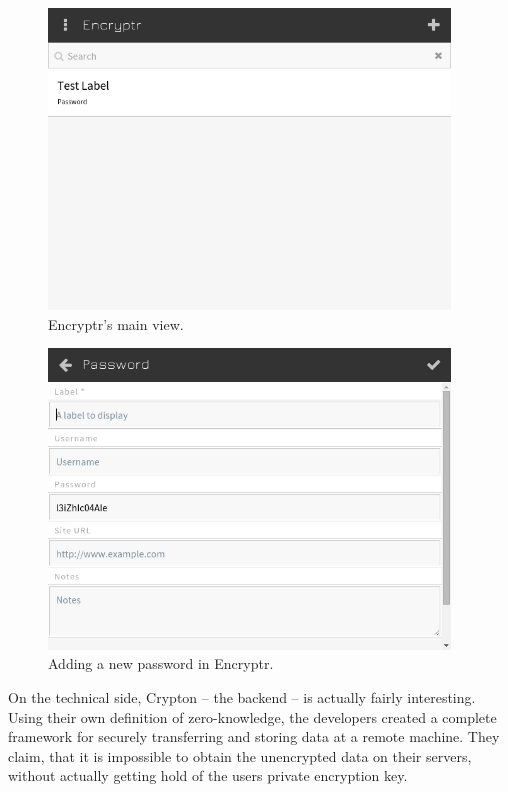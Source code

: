 			\begin{figure}[htbp]
				\centering
				\includegraphics[width=0.95\textwidth]{figures/analysis/encryptr_main.png}
				\caption{Encryptr's main view.}
				\label{fig:encryptr_main}
			\end{figure}


			\begin{figure}[htbp]
				\centering
				\includegraphics[width=0.95\textwidth]{figures/analysis/encryptr_newpassword_main.png}
				\caption{Adding a new password in Encryptr.}
				\label{fig:encryptr_newpassword}
			\end{figure}

			On the technical side, Crypton -- the backend -- is actually fairly interesting. Using their own definition of zero-knowledge, the developers created a complete framework for securely transferring and storing data at a remote machine\cite{crypton_paper}. They claim, that it is impossible to obtain the unencrypted data on their servers, without actually getting hold of the users private encryption key. 








